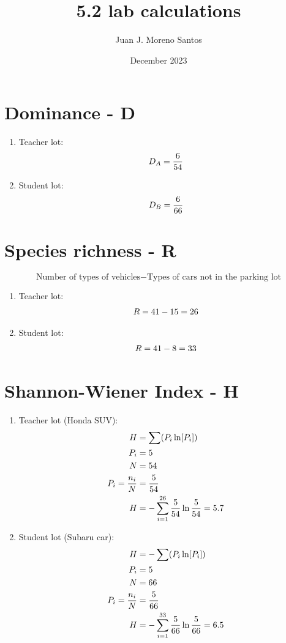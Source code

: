 \documentclass[11pt]{article}
\newcommand*{\set}{\setcounter{equation}{0}}
\begin{document}
\title{5.2 lab calculations}
\author{Juan J. Moreno Santos}
\date{December 2023}

\maketitle
\section{Dominance - D}
\begin{enumerate}
    \item Teacher lot:
        \begin{align}
            \set
            D_A=\frac{6}{54}
        \end{align}
    \item Student lot:
        \begin{align}
            \set
            D_B=\frac{6}{66}
        \end{align}
\end{enumerate}

\section{Species richness - R}
\[\text{Number of types of vehicles}-\text{Types of cars not in the parking lot}\]

\begin{enumerate}
    \item Teacher lot:
        \begin{align}
            \set
            R=41-15=26
        \end{align}
    \item Student lot:
        \begin{align}
            \set
            R=41-8=33
        \end{align}
\end{enumerate}

\section{Shannon-Wiener Index - H}
\begin{enumerate}
\item Teacher lot (Honda SUV):
\begin{align}
    \set
    H&=\sum(P_i\ln[P_i])\\
    P_i&=5\\
    N&=54\\
    P_i=\frac{n_i}{N}&=\frac{5}{54}\\
    H&=-\sum_{i=1}^{26}\frac{5}{54}\ln\frac{5}{54}=5.7
\end{align}
\item Student lot (Subaru car):
\begin{align}
    \set
    H&=-\sum(P_i\ln[P_i])\\
    P_i&=5\\
    N&=66\\
    P_i=\frac{n_i}{N}&=\frac{5}{66}\\
    H&=-\sum_{i=1}^{33}\frac{5}{66}\ln\frac{5}{66}=6.5
\end{align}
\end{enumerate}
\end{document}
